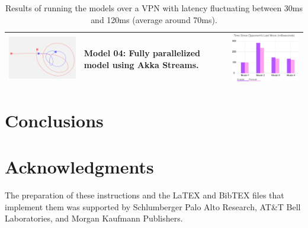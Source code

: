 \documentclass{article}
\begin{document}
\begin{table}[t]
\begin{tabular}{p{6.5cm}p{4cm}p{6.5cm} }
		\hline
		\includegraphics[width=6cm]{model04-vpn}&Model 04: Fully parallelized model using Akka Streams.&\includegraphics[width=6cm]{opp_move_vpn}\\			
		\hline
	\end{tabular}
	\caption{Results of running the models over a VPN with latency fluctuating between 30ms and 120ms (average around 70ms).}
	\label{tab:ResultsVPN}
\end{table}


\section{Conclusions}

\section*{Acknowledgments}
The preparation of these instructions and the LaTEX and BibTEX files that implement them was supported by Schlumberger Palo Alto Research, AT\&T Bell Laboratories, and Morgan Kaufmann Publishers.


%
%


\end{document}
